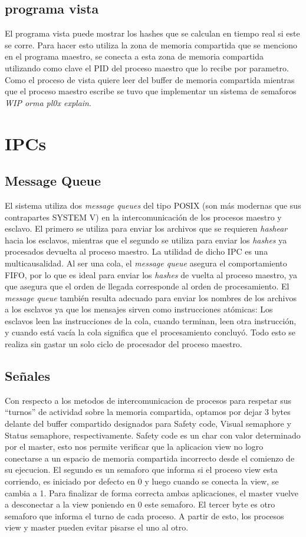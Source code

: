 \documentclass[10pt,a4paper]{report}
\begin{document}
\subsection{programa vista}
	El programa vista puede mostrar los hashes que se calculan en tiempo real si este se corre. Para hacer esto utiliza la zona de memoria compartida que se menciono en el programa maestro, se conecta a esta zona de memoria compartida utilizando como clave el PID del proceso maestro que lo recibe por parametro. Como el proceso de vista quiere leer del buffer de memoria compartida mientras que el proceso maestro escribe se tuvo que implementar un sistema de semaforos \emph{WIP orma pl0x explain}.
\section{IPCs}
\subsection{Message Queue}
	El sistema utiliza dos \textit{message queues} del tipo POSIX (son más modernas que sus contrapartes SYSTEM V) en la intercomunicación de los procesos maestro y esclavo. El primero se utiliza para enviar los archivos que se requieren \textit{hashear} hacia los esclavos, mientras que el segundo se utiliza para enviar los \textit{hashes} ya procesados devuelta al proceso maestro. La utilidad de dicho IPC es una multicausalidad. Al ser una cola, el \textit{message queue} asegura el comportamiento FIFO, por lo que es ideal para enviar los \textit{hashes} de vuelta al proceso maestro, ya que asegura que el orden de llegada corresponde al orden de procesamiento. El \textit{message queue} también resulta adecuado para enviar los nombres de los archivos a los esclavos ya que los mensajes sirven como instrucciones atómicas: Los esclavos leen las instrucciones de la cola, cuando terminan, leen otra instrucción, y cuando está vacía la cola significa que el procesamiento concluyó. Todo esto se realiza sin gastar un solo ciclo de procesador del proceso maestro.
\subsection{Señales} 
Con respecto a los metodos de intercomunicacion de procesos para respetar sus “turnos” de actividad sobre la memoria compartida, optamos por dejar 3 bytes delante del buffer compartido designados para Safety code, Visual semaphore y Status semaphore, respectivamente. 
Safety code es un char con valor determinado por el master, esto nos permite verificar que la aplicacion view no logro conectarse a un espacio de memoria compartida incorrecto desde el comienzo de su ejecucion. 
El segundo es un semaforo que informa si el proceso view esta corriendo, es iniciado por defecto en 0 y luego cuando se conecta la view, se cambia a 1. Para finalizar de forma correcta ambas aplicaciones, el master vuelve a desconectar a la view poniendo en 0 este semaforo.
El tercer byte es otro semaforo que informa el turno de cada proceso. A partir de esto, los procesos view y master pueden evitar pisarse el uno al otro. 
\end{document}
